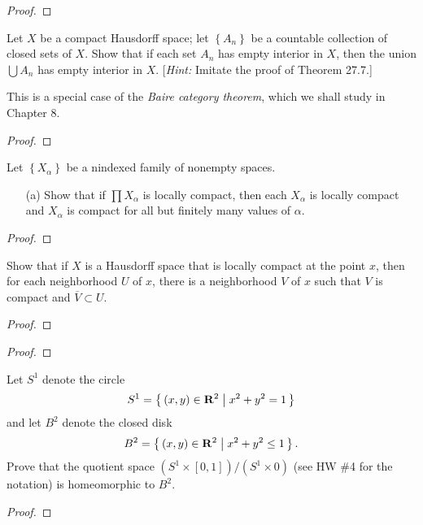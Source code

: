 \begin{proof}
\end{proof}
\newpage
\begin{problem}[Munkres \S27, Ex.\,5]
Let $X$ be a compact Hausdorff space; let $\left\{A_n\right\}$ be
a countable collection of closed sets of $X$. Show that if each
set $A_n$ has empty interior in $X$, then the union $\bigcup A_n$
has empty interior in $X$. [\emph{Hint:} Imitate the proof of
Theorem 27.7.]

This is a special case of the \emph{Baire category theorem},
which we shall study in Chapter 8.
\end{problem}
\begin{proof}
\end{proof}
\newpage
\begin{problem}[Munkres \S28, Ex.\,2(a)]
Let $\left\{X_\alpha\right\}$ be a nindexed family of nonempty
spaces.
\begin{itemize}
\item[(a)] Show that if $\prod X_\alpha$ is locally compact, then
  each $X_\alpha$ is locally compact and $X_\alpha$ is compact
  for all but finitely many values of $\alpha$.
\end{itemize}
\end{problem}
\begin{proof}
\end{proof}
\newpage
\begin{problem}[Munkres \S28, Ex.\,10]
Show that if $X$ is a Hausdorff space that is locally compact at
the point $x$, then for each neighborhood $U$ of $x$, there is a
neighborhood $V$ of $x$ such that $V$ is compact and $\overline
V\subset U$.
\end{problem}
\begin{proof}
\end{proof}
\newpage
\begin{problem}
\end{problem}
\begin{proof}
\end{proof}
\newpage
\begin{problem}[A]
Let $S^1$ denote the circle
\[
S^1=\left\{\,(x,y)\in\mathbf{R}^2\;\middle|\;x^2+y^2=1\,\right\}
\]
and let $B^2$ denote the closed disk
\[
B^2=\left\{\,(x,y)\in\mathbf{R}^2\;\middle|\;x^2+y^2\leq 1\,\right\}.
\]
Prove that the quotient space $(S^1\times[0,1])/(S^1\times 0)$
(see HW \#4 for the notation) is homeomorphic to $B^2$.
\end{problem}
\begin{proof}
\end{proof}

